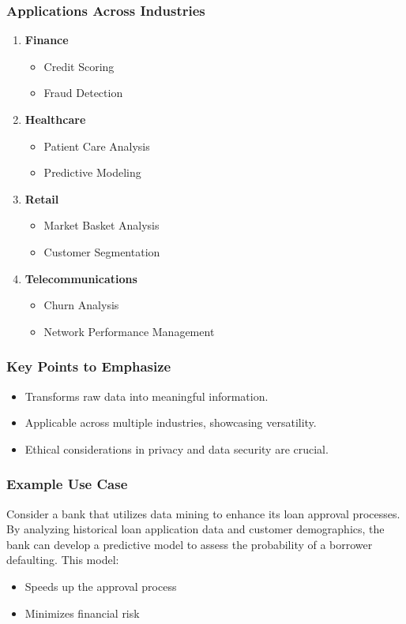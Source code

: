 \documentclass{beamer}
\begin{document}
\begin{frame}[fragile]
    \frametitle{Applications Across Industries}
    \begin{enumerate}
        \item \textbf{Finance}
            \begin{itemize}
                \item Credit Scoring
                \item Fraud Detection
            \end{itemize}
        \item \textbf{Healthcare}
            \begin{itemize}
                \item Patient Care Analysis
                \item Predictive Modeling
            \end{itemize}
        \item \textbf{Retail}
            \begin{itemize}
                \item Market Basket Analysis
                \item Customer Segmentation
            \end{itemize}
        \item \textbf{Telecommunications}
            \begin{itemize}
                \item Churn Analysis
                \item Network Performance Management
            \end{itemize}
    \end{enumerate}
\end{frame}

\begin{frame}[fragile]
    \frametitle{Key Points to Emphasize}
    \begin{itemize}
        \item Transforms raw data into meaningful information.
        \item Applicable across multiple industries, showcasing versatility.
        \item Ethical considerations in privacy and data security are crucial.
    \end{itemize}
\end{frame}

\begin{frame}[fragile]
    \frametitle{Example Use Case}
    Consider a bank that utilizes data mining to enhance its loan approval processes. By analyzing historical loan application data and customer demographics, the bank can develop a predictive model to assess the probability of a borrower defaulting. This model:
    \begin{itemize}
        \item Speeds up the approval process
        \item Minimizes financial risk
    \end{itemize}
\end{frame}
\end{document}
